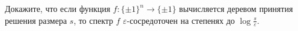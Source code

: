 Докажите, что если функция $f\colon \{\pm 1\}^n \to \{\pm 1\}$ вычисляется деревом принятия решения
размера $s$, то спектр $f$ $\varepsilon$-сосредоточен на степенях до $\log{\frac{s}{\varepsilon}}$.